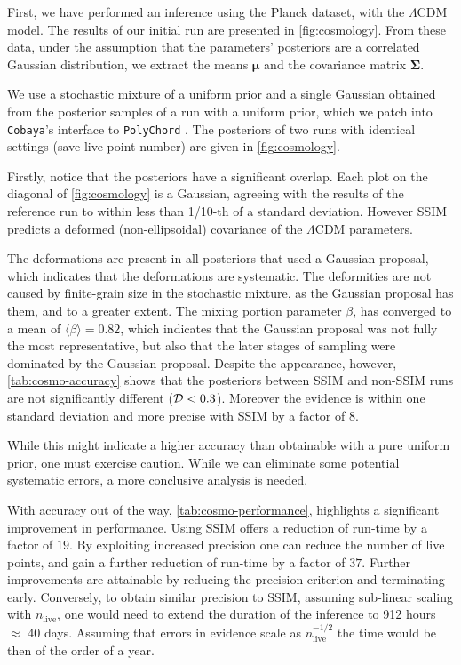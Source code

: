\documentclass[usenatbib]{mnras}
\begin{document}
First, we have performed an inference using the Planck \citep{Planck} dataset,
with the \(\Lambda\)CDM model. The results of our initial run are
presented in \cref{fig:cosmology}. From these data, under the
assumption that the parameters' posteriors are a correlated Gaussian
distribution, we extract the means $\bm{\mu}$ and the covariance
matrix \(\bm{\Sigma}\).

We use a stochastic mixture of a uniform prior and a single Gaussian
obtained from the posterior samples of a run with a uniform prior,
which we patch into \texttt{Cobaya}'s interface to \texttt{PolyChord}
\citep{code}. The posteriors of two runs with identical settings (save
live point number) are given in \cref{fig:cosmology}.

Firstly, notice that the posteriors have a significant overlap. Each
plot on the diagonal of \cref{fig:cosmology} is a Gaussian, agreeing
with the results of the reference run to within less than 1/10-th of a
standard deviation. However SSIM predicts a deformed (non-ellipsoidal)
covariance of the \(\Lambda\)CDM parameters. 

The deformations are present in all posteriors that used a Gaussian
proposal, which indicates that the deformations are systematic. The
deformities are not caused by finite-grain size in the stochastic
mixture, as the Gaussian proposal has them, and to a greater
extent. The mixing portion parameter $\beta$, has converged to a mean
of $\langle \beta \rangle = 0.82$, which indicates that the Gaussian
proposal was not fully the most representative, but also that the
later stages of sampling were dominated by the Gaussian
proposal. Despite the appearance, however, \cref{tab:cosmo-accuracy}
shows that the posteriors between SSIM and non-SSIM runs are not
significantly different (${\cal D}< 0.3$). Moreover the evidence is
within one standard deviation and more precise with SSIM by a factor
of \(8\).

While this might indicate a higher accuracy than obtainable with a
pure uniform prior, one must exercise caution. While we can eliminate
some potential systematic errors, a more conclusive analysis is
needed.

With accuracy out of the way, \cref{tab:cosmo-performance}, highlights
a significant improvement in performance. Using SSIM offers a
reduction of run-time by a factor of \(19\). By exploiting increased
precision one can reduce the number of live points, and gain a further
reduction of run-time by a factor of \(37\). Further improvements are
attainable by reducing the precision criterion and terminating
early. Conversely, to obtain similar precision to SSIM, assuming
sub-linear scaling with \(n_\text{live}\), one would need to extend
the duration of the inference to 912 hours \(\approx\) 40
days. Assuming that errors in evidence scale as
\(n_\text{live}^{-1/2}\) the time would be then of the order of a
year.
\end{document}
